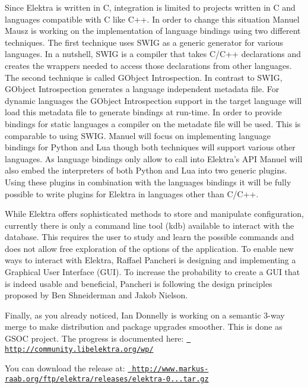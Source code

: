 Since Elektra is written in C, integration is limited to projects written in C and languages compatible with C like C++. In order to change this situation Manuel Mausz is working on the implementation of language bindings using two different techniques. The first technique uses S\+W\+IG as a generic generator for various languages. In a nutshell, S\+W\+IG is a compiler that takes C/\+C++ declarations and creates the wrappers needed to access those declarations from other languages. The second technique is called G\+Object Introspection. In contrast to S\+W\+IG, G\+Object Introspection generates a language independent metadata file. For dynamic languages the G\+Object Introspection support in the target language will load this metadata file to generate bindings at run-\/time. In order to provide bindings for static languages a compiler on the metadate file will be used. This is comparable to using S\+W\+IG. Manuel will focus on implementing language bindings for Python and Lua though both techniques will support various other languages. As language bindings only allow to call into Elektra’s A\+PI Manuel will also embed the interpreters of both Python and Lua into two generic plugins. Using these plugins in combination with the languages bindings it will be fully possible to write plugins for Elektra in languages other than C/\+C++.

While Elektra offers sophisticated methods to store and manipulate configuration, currently there is only a command line tool (kdb) available to interact with the database. This requires the user to study and learn the possible commands and does not allow free exploration of the options of the application. To enable new ways to interact with Elektra, Raffael Pancheri is designing and implementing a Graphical User Interface (G\+UI). To increase the probability to create a G\+UI that is indeed usable and beneficial, Pancheri is following the design principles proposed by Ben Shneiderman and Jakob Nielson.

Finally, as you already noticed, Ian Donnelly is working on a semantic 3-\/way merge to make distribution and package upgrades smoother. This is done as G\+S\+OC project. The progress is documented here\+: \href{http://community.libelektra.org/wp/}{\texttt{ http\+://community.\+libelektra.\+org/wp/}}

You can download the release at\+: \href{http://www.markus-raab.org/ftp/elektra/releases/elektra-0.8.6.tar.gz}{\texttt{ http\+://www.\+markus-\/raab.\+org/ftp/elektra/releases/elektra-\/0...\+tar.\+gz}}


